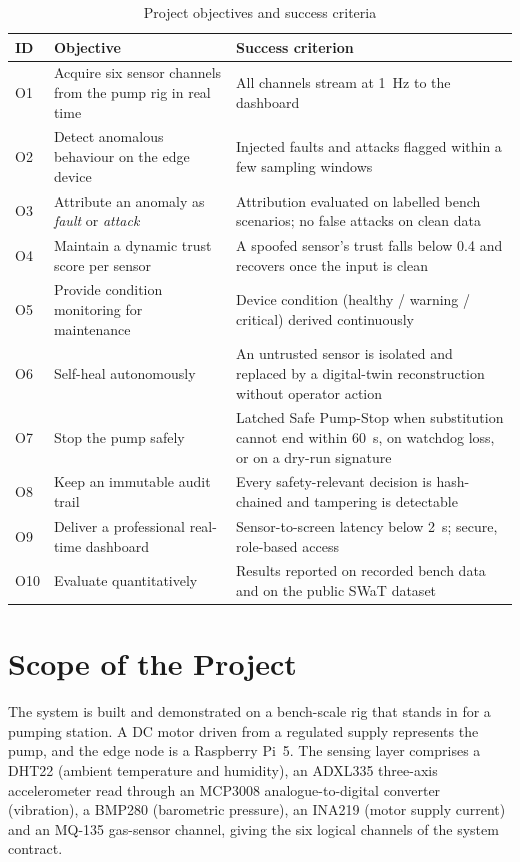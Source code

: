 \begin{table}[htbp]
\centering
\caption{Project objectives and success criteria}
\label{tab:objectives}
\begin{tabularx}{\textwidth}{@{}l X X@{}}
\toprule
\textbf{ID} & \textbf{Objective} & \textbf{Success criterion} \\
\midrule
O1 & Acquire six sensor channels from the pump rig in real time & All channels stream at 1~Hz to the dashboard \\
O2 & Detect anomalous behaviour on the edge device & Injected faults and attacks flagged within a few sampling windows \\
O3 & Attribute an anomaly as \emph{fault} or \emph{attack} & Attribution evaluated on labelled bench scenarios; no false attacks on clean data \\
O4 & Maintain a dynamic trust score per sensor & A spoofed sensor's trust falls below 0.4 and recovers once the input is clean \\
O5 & Provide condition monitoring for maintenance & Device condition (healthy / warning / critical) derived continuously \\
O6 & Self-heal autonomously & An untrusted sensor is isolated and replaced by a digital-twin reconstruction without operator action \\
O7 & Stop the pump safely & Latched Safe Pump-Stop when substitution cannot end within 60~s, on watchdog loss, or on a dry-run signature \\
O8 & Keep an immutable audit trail & Every safety-relevant decision is hash-chained and tampering is detectable \\
O9 & Deliver a professional real-time dashboard & Sensor-to-screen latency below 2~s; secure, role-based access \\
O10 & Evaluate quantitatively & Results reported on recorded bench data and on the public SWaT dataset \\
\bottomrule
\end{tabularx}
\end{table}

\section{Scope of the Project}

The system is built and demonstrated on a bench-scale rig that stands in for a pumping station. A DC motor driven from a regulated supply represents the pump, and the edge node is a Raspberry Pi~5. The sensing layer comprises a DHT22 (ambient temperature and humidity), an ADXL335 three-axis accelerometer read through an MCP3008 analogue-to-digital converter (vibration), a BMP280 (barometric pressure), an INA219 (motor supply current) and an MQ-135 gas-sensor channel, giving the six logical channels of the system contract.

